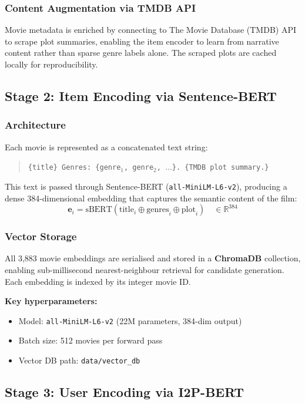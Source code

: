 \documentclass[11pt,a4paper]{article}
\begin{document}
\subsubsection{Content Augmentation via TMDB API}
Movie metadata is enriched by connecting to The Movie Database (TMDB) API to scrape plot summaries, enabling the item encoder to learn from narrative content rather than sparse genre labels alone. The scraped plots are cached locally for reproducibility.

\subsection{Stage 2: Item Encoding via Sentence-BERT}

\subsubsection{Architecture}
Each movie is represented as a concatenated text string:
\begin{quote}
  \texttt{\{title\} Genres: \{genre$_1$, genre$_2$, $\ldots$\}. \{TMDB plot summary.\}}
\end{quote}
This text is passed through Sentence-BERT (\texttt{all-MiniLM-L6-v2}), producing a dense 384-dimensional embedding that captures the semantic content of the film:
\begin{equation}
  \mathbf{e}_i = \text{sBERT}(\text{title}_i \oplus \text{genres}_i \oplus \text{plot}_i) \quad \in \mathbb{R}^{384}
\end{equation}

\subsubsection{Vector Storage}
All 3,883 movie embeddings are serialised and stored in a \textbf{ChromaDB} collection, enabling sub-millisecond nearest-neighbour retrieval for candidate generation. Each embedding is indexed by its integer movie ID.

\textbf{Key hyperparameters:}
\begin{itemize}[leftmargin=1.5em, noitemsep]
  \item Model: \texttt{all-MiniLM-L6-v2} (22M parameters, 384-dim output)
  \item Batch size: 512 movies per forward pass
  \item Vector DB path: \texttt{data/vector\_db}
\end{itemize}

\subsection{Stage 3: User Encoding via I2P-BERT}
\end{document}

